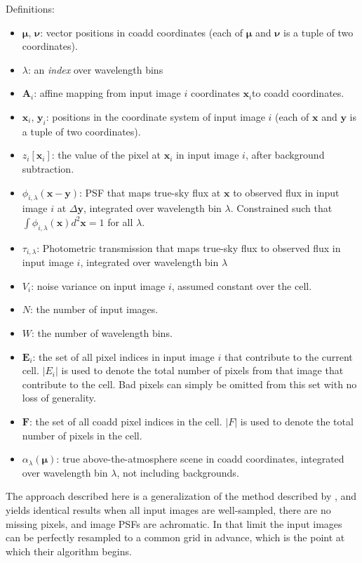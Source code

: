 \documentclass[DM,authoryear,toc]{lsstdoc}
\begin{document}
Definitions:
\begin{itemize}
\item $\bm{\mu}$, $\bm{\nu}$: vector positions in coadd coordinates (each of $\bm{\mu}$ and $\bm{\nu}$ is a tuple of two coordinates).
\item $\lambda$: an \emph{index} over wavelength bins
\item $\bm{A}_i$: affine mapping from input image $i$ coordinates $\bm{x}_i$to coadd coordinates.
\item $\bm{x}_{i}$, $\bm{y}_i$: positions in the coordinate system of input image $i$ (each of $\bm{x}$ and $\bm{y}$ is a tuple of two coordinates).
\item $z_{i}[\bm{x}_i]$: the value of the pixel at $\bm{x}_i$ in input image $i$, after background subtraction.
\item $\phi_{i,\lambda}(\bm{x}-\bm{y})$: PSF that maps true-sky flux at $\bm{x}$ to observed flux in input image $i$ at $\Delta\bm{y}$, integrated over wavelength bin $\lambda$.  Constrained such that
$\int \phi_{i,\lambda}(\bm{x}) d^2\bm{x} = 1$ for all $\lambda$.
\item $\tau_{i,\lambda}$: Photometric transmission that maps true-sky flux to observed flux in input image $i$, integrated over wavelength bin $\lambda$
\item $V_{i}$: noise variance on input image $i$, assumed constant over the cell.
\item $N$: the number of input images.
\item $W$: the number of wavelength bins.
\item $\bm{E}_i$: the set of all pixel indices in input image $i$ that contribute to the current cell.  $|E_i|$ is used to denote the total number of pixels from that image that contribute to the cell.  Bad pixels can simply be omitted from this set with no loss of generality.
\item $\bm{F}$: the set of all coadd pixel indices in the cell.  $|F|$ is used to denote the total number of pixels in the cell.
\item $\alpha_{\lambda}(\bm{\mu})$: true above-the-atmosphere scene in coadd coordinates, integrated over wavelength bin $\lambda$, not including backgrounds.
\end{itemize}

The approach described here is a generalization of the method described by \citet{2015arXiv151206879Z}, and yields identical results when all input images are well-sampled, there are no missing pixels, and image PSFs are achromatic.  In that limit the input images can be perfectly resampled to a common grid in advance, which is the point at which their algorithm begins.
\end{document}
